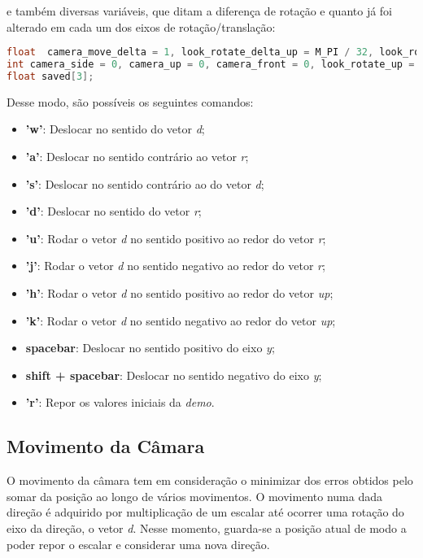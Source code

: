 \documentclass[14pt, a4 paper]{report}
\begin{document}
e também diversas variáveis, que ditam a diferença de rotação e quanto já foi alterado em cada um dos eixos de rotação/translação:

\begin{lstlisting}[language = c++]
float  camera_move_delta = 1, look_rotate_delta_up = M_PI / 32, look_rotate_delta_right = M_PI / 32;
int camera_side = 0, camera_up = 0, camera_front = 0, look_rotate_up = 0, look_rotate_right = 0;
float saved[3];
\end{lstlisting}

Desse modo, são possíveis os seguintes comandos:

\begin{itemize}
    \item \textbf{'w'}: Deslocar no sentido do vetor \textit{d};
    \item \textbf{'a'}: Deslocar no sentido contrário ao vetor \textit{r};
    \item \textbf{'s'}: Deslocar no sentido contrário ao do vetor \textit{d};
    \item \textbf{'d'}: Deslocar no sentido do vetor \textit{r};
    \item \textbf{'u'}: Rodar o vetor \textit{d} no sentido positivo ao redor do vetor \textit{r};
    \item \textbf{'j'}: Rodar o vetor \textit{d} no sentido negativo ao redor do vetor \textit{r};
    \item \textbf{'h'}: Rodar o vetor \textit{d} no sentido positivo ao redor do vetor \textit{up};
    \item \textbf{'k'}: Rodar o vetor \textit{d} no sentido negativo ao redor do vetor \textit{up};
    \item \textbf{spacebar}: Deslocar no sentido positivo do eixo \textit{y};
    \item \textbf{shift + spacebar}: Deslocar no sentido negativo do eixo \textit{y};
    \item \textbf{'r'}: Repor os valores iniciais da \textit{demo}.
\end{itemize}

\subsection{Movimento da Câmara}

O movimento da câmara tem em consideração o minimizar dos erros obtidos pelo somar da posição ao longo de vários movimentos. O movimento numa dada direção é adquirido por multiplicação de um escalar até ocorrer uma rotação do eixo da direção, o vetor \textit{d}. Nesse momento, guarda-se a posição atual de modo a poder repor o escalar e considerar uma nova direção. 
\end{document}
